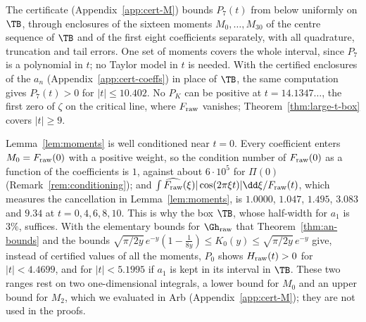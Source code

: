 The certificate (Appendix~\ref{app:cert-M}) bounds $P_7(t)$ from below uniformly on $\TB$, through enclosures of the sixteen moments
$M_0,\dots,M_{30}$ of the centre sequence of $\TB$ and of the first eight coefficients separately, with all quadrature, truncation and tail
errors. One set of moments covers the whole interval, since $P_7$ is a polynomial in $t$; no Taylor model in $t$ is needed.
With the certified enclosures of the $a_n$ (Appendix~\ref{app:cert-coeffs}) in place of $\TB$, the same computation gives $P_7(t)>0$ for
$|t|\le10.402$. No $P_K$ can be positive at $t=14.1347\ldots$, the first zero of $\zeta$ on the critical line, where $F_{\rm raw}$ vanishes;
Theorem~\ref{thm:large-t-box} covers $|t|\ge9$.

\begin{remark}\label{rem:moments}
Lemma~\ref{lem:moments} is well conditioned near $t=0$. Every coefficient enters $M_0=F_{\rm raw}(0)$ with a positive weight, so the condition
number of $F_{\rm raw}(0)$ as a function of the coefficients is $1$, against about $6\cdot10^5$ for $\Pi(0)$ (Remark~\ref{rem:conditioning}); and
$\int\widehat{F_{\rm raw}}(\xi)|\cos(2\pi\xi t)|\dd\xi/F_{\rm raw}(t)$, which measures the cancellation in Lemma~\ref{lem:moments}, is $1.0000$,
$1.047$, $1.495$, $3.083$ and $9.34$ at $t=0,4,6,8,10$. This is why the box $\TB$, whose half-width for $a_1$ is $3\%$, suffices. With the
elementary bounds for $\Gh_{\rm raw}$ that Theorem~\ref{thm:an-bounds} and the bounds
$\sqrt{\pi/2y}\,e^{-y}(1-\frac1{8y})\le K_0(y)\le\sqrt{\pi/2y}\,e^{-y}$ give, instead of certified values of all the moments, $P_0$ shows
$H_{\rm raw}(t)>0$ for $|t|<4.4699$, and for $|t|<5.1995$ if $a_1$ is kept in its interval in $\TB$. These two ranges rest on two
one-dimensional integrals, a lower bound for $M_0$ and an upper bound for $M_2$, which we evaluated in Arb (Appendix~\ref{app:cert-M}); they are not
used in the proofs.
\end{remark}
